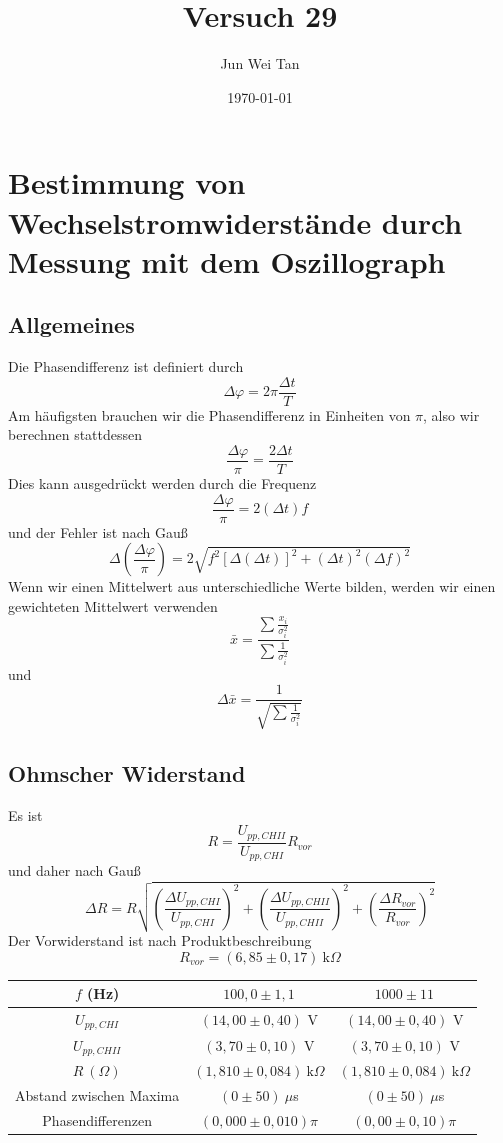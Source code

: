\documentclass[prb,12pt]{revtex4-2}
\theoremstyle{definition}
\theoremstyle{definition}
\begin{document}
\title{Versuch 29}
	\author{Jun Wei Tan}
	\date{\today}
	\maketitle

\section{Bestimmung von Wechselstromwiderstände durch Messung mit dem Oszillograph}
\subsection{Allgemeines}
Die Phasendifferenz ist definiert durch
\[\Delta\varphi=2\pi\frac{\Delta t}{T}\]
Am häufigsten brauchen wir die Phasendifferenz in Einheiten von $\pi$, also wir berechnen stattdessen
\[\frac{\Delta \varphi}{\pi}=\frac{2\Delta t}{T}\]
Dies kann ausgedrückt werden durch die Frequenz
\[\frac{\Delta \varphi}{\pi}=2(\Delta t)f\]
und der Fehler ist nach Gauß
\[\Delta \left(\frac{\Delta \varphi}{\pi}\right)=2\sqrt{f^2 [\Delta(\Delta t)]^2+(\Delta t)^2 (\Delta f)^2}\]
Wenn wir einen Mittelwert aus unterschiedliche Werte bilden, werden wir einen gewichteten Mittelwert verwenden
\[\bar{x}= \frac{\sum \frac{x_i}{\sigma_i^2}}{\sum \frac{1}{\sigma_i^2}}\]
und
\[\Delta \bar{x}=\frac{1}{\sqrt{\sum \frac{1}{\sigma_i^2}}}\]
\subsection{Ohmscher Widerstand}
Es ist
\[R=\frac{U_{pp,CHII}}{U_{pp,CHI}}R_{vor}\]
und daher nach Gauß
\[\Delta R = R\sqrt{\left(\frac{\Delta {U_{pp,CHI}}}{U_{pp,CHI}}\right)^2 + \left(\frac{\Delta {U_{pp,CHII}}}{U_{pp,CHII}}\right)^2+\left(\frac{\Delta R_{vor}}{R_{vor}}\right)^2}\]
Der Vorwiderstand ist nach Produktbeschreibung
\[R_{vor}=(6,85\pm 0,17)~\text{k}\Omega\]
\begin{center}                                                                         
 \begin{tabular}{ccc}
 	\toprule
 	$f$ (Hz) & $100,0\pm 1,1$ & $1000\pm 11$\\\midrule
 	$U_{pp,CHI}$ & $(14,00\pm 0,40)$ V & $(14,00\pm 0,40)$ V\\\midrule
 	$U_{pp,CHII}$ & $(3,70\pm 0,10)$ V & $(3,70\pm 0,10)$ V\\\midrule
 	$R~(\Omega)$ & $(1,810\pm 0,084)~\text{k}\Omega$ & $(1,810\pm 0,084)~\text{k}\Omega$\\\midrule
 	Abstand zwischen Maxima & $(0\pm 50)~\mu$s & $(0\pm 50)~\mu$s\\\midrule
 	Phasendifferenzen & $(0,000\pm 0,010)\pi$ & $(0,00\pm 0,10)\pi$\\\bottomrule
 \end{tabular}
\end{center}
\end{document}
